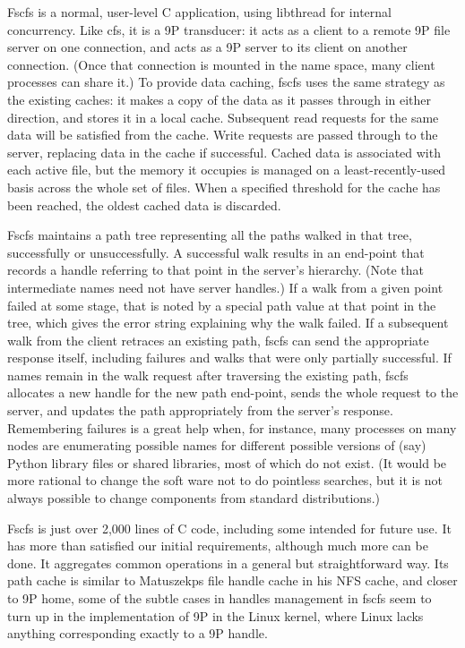 Fscfs is a normal, user-level C application, using libthread for internal 
concurrency. Like cfs, it is a 9P transducer: it acts as a client to a 
remote 9P file server on one connection, and acts as a 9P server to its 
client on another connection. (Once that connection is mounted in the name 
space, many client processes can share it.) To provide data caching, fscfs 
uses the same strategy as the existing caches: it makes a copy of the ­data
as it passes through in either direction, and stores it in a local cache. 
Subsequent read requests for the same data will be satisfied from the cache. 
Write requests are passed through to the server, replacing data in the 
cache if successful. Cached data is associated with each active file, but the 
memory it occupies is managed on a least-recently-used basis across the 
whole set of files. When a specified threshold for the cache has been reached, 
the oldest cached data is discarded.

Fscfs maintains a path tree representing all the paths walked in that tree, 
successfully or 
unsuccessfully. A successful walk results in an end-point that records a
handle referring to that point in the server's hierarchy. (Note that 
intermediate names need not have server handles.) If a walk from a
given point failed at some stage, that is noted by a special path value at 
that point in the tree, which gives the error string explaining why the walk 
failed. If a subsequent walk from the client retraces an existing path, 
fscfs can send the appropriate response itself, including failures and walks 
that were only partially successful. If names remain in the walk request 
after traversing the existing path, fscfs allocates a new handle for the new 
path end-point, sends the whole request to the server, and updates the path 
appropriately from the server's response. Remembering failures is a
great help when, for instance, many processes on many nodes are enumerating 
possible names for different possible versions of (say) Python library 
files or shared libraries, most of which do not exist. (It would be more 
rational to change the soft ware not to do pointless searches, but it is not 
always possible to change components from standard distributions.)

Fscfs is just over 2,000 lines of C code, including some intended for future 
use. It has more than satisfied our initial requirements, although much more 
can be done. It aggregates common operations in a general but straightforward 
way. Its path cache is similar to Matuszekps file handle cache in his NFS cache,
and closer to 9P home, some of the subtle cases in handles management in 
fscfs seem to turn up in the implementation of 9P in the Linux kernel, 
where Linux lacks anything corresponding exactly to a 9P handle.

